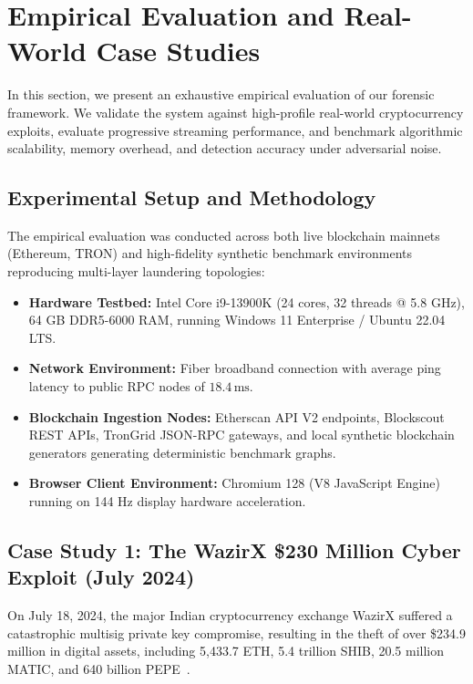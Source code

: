 \section{Empirical Evaluation and Real-World Case Studies}
\label{sec:case_studies}

In this section, we present an exhaustive empirical evaluation of our forensic framework. We validate the system against high-profile real-world cryptocurrency exploits, evaluate progressive streaming performance, and benchmark algorithmic scalability, memory overhead, and detection accuracy under adversarial noise.

\subsection{Experimental Setup and Methodology}

The empirical evaluation was conducted across both live blockchain mainnets (Ethereum, TRON) and high-fidelity synthetic benchmark environments reproducing multi-layer laundering topologies:

\begin{itemize}
    \item \textbf{Hardware Testbed:} Intel Core i9-13900K (24 cores, 32 threads @ 5.8 GHz), 64 GB DDR5-6000 RAM, running Windows 11 Enterprise / Ubuntu 22.04 LTS.
    \item \textbf{Network Environment:} Fiber broadband connection with average ping latency to public RPC nodes of $18.4\,\text{ms}$.
    \item \textbf{Blockchain Ingestion Nodes:} Etherscan API V2 endpoints, Blockscout REST APIs, TronGrid JSON-RPC gateways, and local synthetic blockchain generators generating deterministic benchmark graphs.
    \item \textbf{Browser Client Environment:} Chromium 128 (V8 JavaScript Engine) running on 144 Hz display hardware acceleration.
\end{itemize}

\subsection{Case Study 1: The WazirX \$230 Million Cyber Exploit (July 2024)}

On July 18, 2024, the major Indian cryptocurrency exchange WazirX suffered a catastrophic multisig private key compromise, resulting in the theft of over \$234.9 million in digital assets, including 5,433.7 ETH, 5.4 trillion SHIB, 20.5 million MATIC, and 640 billion PEPE~\cite{chainalysis2024crime}.

